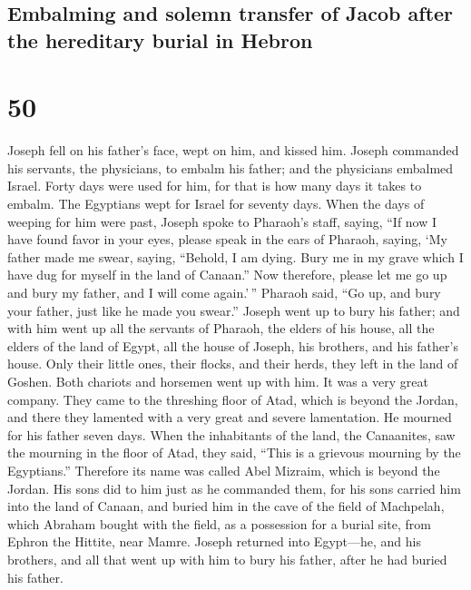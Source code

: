 \hypertarget{embalming-and-solemn-transfer-of-jacob-after-the-hereditary-burial-in-hebron}{%
\subsection{Embalming and solemn transfer of Jacob after the hereditary
burial in
Hebron}\label{embalming-and-solemn-transfer-of-jacob-after-the-hereditary-burial-in-hebron}}

\hypertarget{section-49}{%
\section{50}\label{section-49}}

 Joseph fell on his father's face, wept on him, and kissed
him.  Joseph commanded his servants, the physicians, to
embalm his father; and the physicians embalmed Israel. 
Forty days were used for him, for that is how many days it takes to
embalm. The Egyptians wept for Israel for seventy days. 
When the days of weeping for him were past, Joseph spoke to Pharaoh's
staff, saying, ``If now I have found favor in your eyes, please speak in
the ears of Pharaoh, saying,  `My father made me swear,
saying, ``Behold, I am dying. Bury me in my grave which I have dug for
myself in the land of Canaan.'' Now therefore, please let me go up and
bury my father, and I will come again.'\,''  Pharaoh said,
``Go up, and bury your father, just like he made you swear.''
 Joseph went up to bury his father; and with him went up
all the servants of Pharaoh, the elders of his house, all the elders of
the land of Egypt,  all the house of Joseph, his brothers,
and his father's house. Only their little ones, their flocks, and their
herds, they left in the land of Goshen.  Both chariots and
horsemen went up with him. It was a very great company. 
They came to the threshing floor of Atad, which is beyond the Jordan,
and there they lamented with a very great and severe lamentation. He
mourned for his father seven days.  When the inhabitants
of the land, the Canaanites, saw the mourning in the floor of Atad, they
said, ``This is a grievous mourning by the Egyptians.'' Therefore its
name was called Abel Mizraim, which is beyond the Jordan.
 His sons did to him just as he commanded them,
 for his sons carried him into the land of Canaan, and
buried him in the cave of the field of Machpelah, which Abraham bought
with the field, as a possession for a burial site, from Ephron the
Hittite, near Mamre.  Joseph returned into Egypt---he,
and his brothers, and all that went up with him to bury his father,
after he had buried his father.

